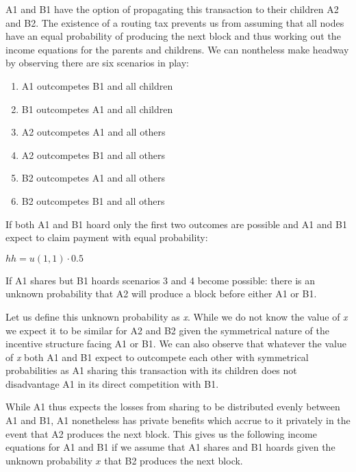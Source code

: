 \documentclass[oneside]{article}   	%
\begin{document}
\begin{multicols}{2}
A1 and B1 have the option of propagating this transaction to their children A2 and B2. The existence of a routing tax prevents us from assuming that all nodes have an equal probability of producing the next block and thus working out the income equations for the parents and childrens. We can nontheless make headway by observing there are six scenarios in play:

\begin{enumerate}
  \item A1 outcompetes B1 and all children
  \item B1 outcompetes A1 and all children
  \item A2 outcompetes A1 and all others
  \item A2 outcompetes B1 and all others
  \item B2 outcompetes A1 and all others
  \item B2 outcompetes B1 and all others
\end{enumerate}

If both A1 and B1 hoard only the first two outcomes are possible and A1 and B1 expect to claim payment with equal probability:

\large
\begin{adjustwidth}{1.5em}{1.5em} 
	\begin{math}
h h = u(1, 1) \cdot 0.5
	\end{math}
\end{adjustwidth}
\normalsize

If A1 shares but B1 hoards scenarios 3 and 4 become possible: there is an unknown probability that A2 will produce a block before either A1 or B1.

Let us define this unknown probability as \textit{x}. While we do not know the value of \textit{x} we expect it to be similar for A2 and B2 given the symmetrical nature of the incentive structure facing A1 or B1. We can also observe that whatever the value of \textit{x} both A1 and B1 expect to outcompete each other with symmetrical probabilities as A1 sharing this transaction with its children does not disadvantage A1 in its direct competition with B1.

While A1 thus expects the losses from sharing to be distributed evenly between A1 and B1, A1 nonetheless has private benefits which accrue to it privately in the event that A2 produces the next block. This gives us the following income equations for A1 and B1 if we assume that A1 shares and B1 hoards given the unknown probability \begin{math}x\end{math} that B2 produces the next block.


\end{multicols}
\end{document}
